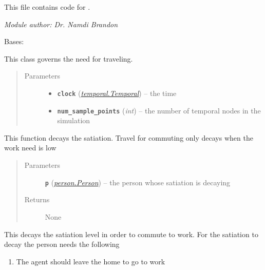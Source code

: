 \documentclass[letterpaper,10pt,english]{sphinxmanual}
\begin{document}
This file contains code for {\hyperref[travel:travel.Travel]{\emph{}}}.

\emph{Module author: Dr. Namdi Brandon}

\begin{fulllineitems}
\label{travel:travel.Travel}
Bases: {\hyperref[need:need.Need]{\emph{}}}

This class governs the need for traveling.
\begin{quote}\begin{description}
\item[{Parameters}] \leavevmode\begin{itemize}
\item {} 
\textbf{\texttt{clock}} ({\hyperref[temporal:temporal.Temporal]{\emph{\emph{temporal.Temporal}}}}) -- the time

\item {} 
\textbf{\texttt{num\_sample\_points}} (\emph{int}) -- the number of temporal nodes in the simulation

\end{itemize}

\end{description}\end{quote}

\begin{fulllineitems}
\label{travel:travel.Travel.decay}
This function decays the satiation. Travel for commuting only decays when the work need is low
\begin{quote}\begin{description}
\item[{Parameters}] \leavevmode
\textbf{\texttt{p}} ({\hyperref[person:person.Person]{\emph{\emph{person.Person}}}}) -- the person whose satiation is decaying

\item[{Returns}] \leavevmode
None

\end{description}\end{quote}

\end{fulllineitems}


\begin{fulllineitems}
\label{travel:travel.Travel.decay_work_commute}
This decays the satiation level in order to commute to work. For the satiation to decay the         person needs the following
\begin{enumerate}
\item {} 
The agent should leave the home to go to work


\end{enumerate}
\end{fulllineitems}
\end{fulllineitems}
\end{document}
